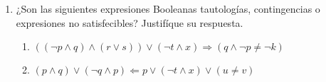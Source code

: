 \documentclass{article}
\begin{document}
\begin{enumerate}
	\item ¿Son las siguientes expresiones Booleanas tautologías, contingencias o expresiones no satisfecibles? Justifíque su respuesta.

	\begin{enumerate}
		\item $((\neg p \land q) \land (r \lor s)) \lor (\neg t \land x) \Rightarrow (q \land \neg p \neq \neg k)$
		
		\item $(p \land q) \lor (\neg q \land p) \Leftarrow p \lor (\neg t \land x) \lor (u \neq v)$
	\end{enumerate}

\end{enumerate}
\end{document}
